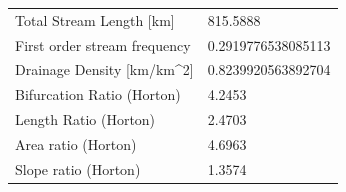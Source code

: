 \documentclass[11pt,]{article}
\begin{document}
\begin{longtable}[]{@{}ll@{}}
\begin{minipage}[t]{0.66\columnwidth}\raggedright\strut
Total Stream Length {[}km{]}\strut
\end{minipage} & \begin{minipage}[t]{0.28\columnwidth}\raggedright\strut
815.5888\strut
\end{minipage}\tabularnewline
\begin{minipage}[t]{0.66\columnwidth}\raggedright\strut
First order stream frequency\strut
\end{minipage} & \begin{minipage}[t]{0.28\columnwidth}\raggedright\strut
0.2919776538085113\strut
\end{minipage}\tabularnewline
\begin{minipage}[t]{0.66\columnwidth}\raggedright\strut
Drainage Density {[}km/km\^{}2{]}\strut
\end{minipage} & \begin{minipage}[t]{0.28\columnwidth}\raggedright\strut
0.8239920563892704\strut
\end{minipage}\tabularnewline
\begin{minipage}[t]{0.66\columnwidth}\raggedright\strut
Bifurcation Ratio (Horton)\strut
\end{minipage} & \begin{minipage}[t]{0.28\columnwidth}\raggedright\strut
4.2453\strut
\end{minipage}\tabularnewline
\begin{minipage}[t]{0.66\columnwidth}\raggedright\strut
Length Ratio (Horton)\strut
\end{minipage} & \begin{minipage}[t]{0.28\columnwidth}\raggedright\strut
2.4703\strut
\end{minipage}\tabularnewline
\begin{minipage}[t]{0.66\columnwidth}\raggedright\strut
Area ratio (Horton)\strut
\end{minipage} & \begin{minipage}[t]{0.28\columnwidth}\raggedright\strut
4.6963\strut
\end{minipage}\tabularnewline
\begin{minipage}[t]{0.66\columnwidth}\raggedright\strut
Slope ratio (Horton)\strut
\end{minipage} & \begin{minipage}[t]{0.28\columnwidth}\raggedright\strut
1.3574\strut
\end{minipage}\tabularnewline
\bottomrule
\end{longtable}
\end{document}
